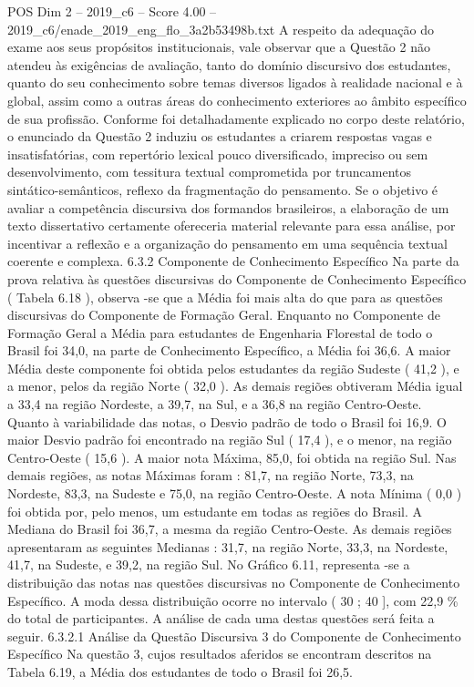 \begin{textsample}{POS Dim 2 – 2019\_c6 – Score 4.00 – 2019\_c6/enade\_2019\_eng\_flo\_3a2b53498b.txt}
A respeito da adequação do exame aos seus propósitos institucionais, vale observar que a Questão 2 não atendeu às exigências de avaliação, tanto do domínio discursivo dos estudantes, quanto do seu conhecimento sobre temas diversos ligados à realidade nacional e à global, assim como a outras áreas do conhecimento exteriores ao âmbito específico de sua profissão.
Conforme foi detalhadamente explicado no corpo deste relatório, o enunciado da Questão 2 induziu os estudantes a criarem respostas vagas e insatisfatórias, com repertório lexical pouco diversificado, impreciso ou sem desenvolvimento, com tessitura textual comprometida por truncamentos sintático-semânticos, reflexo da fragmentação do pensamento.
Se o objetivo é avaliar a competência discursiva dos formandos brasileiros, a elaboração de um texto dissertativo certamente ofereceria material relevante para essa análise, por incentivar a reflexão e a organização do pensamento em uma sequência textual coerente e complexa. 6.3.2 Componente de Conhecimento Específico Na parte da prova relativa às questões discursivas do Componente de Conhecimento Específico ( Tabela 6.18 ), observa -se que a Média foi mais alta do que para as questões discursivas do Componente de Formação Geral.
Enquanto no Componente de Formação Geral a Média para estudantes de Engenharia Florestal de todo o Brasil foi 34,0, na parte de Conhecimento Específico, a Média foi 36,6.
A maior Média deste componente foi obtida pelos estudantes da região Sudeste ( 41,2 ), e a menor, pelos da região Norte ( 32,0 ).
As demais regiões obtiveram Média igual a 33,4 na região Nordeste, a 39,7, na Sul, e a 36,8 na região Centro-Oeste.
Quanto à variabilidade das notas, o Desvio padrão de todo o Brasil foi 16,9.
O maior Desvio padrão foi encontrado na região Sul ( 17,4 ), e o menor, na região Centro-Oeste ( 15,6 ).
A maior nota Máxima, 85,0, foi obtida na região Sul.
Nas demais regiões, as notas Máximas foram : 81,7, na região Norte, 73,3, na Nordeste, 83,3, na Sudeste e 75,0, na região Centro-Oeste.
A nota Mínima ( 0,0 ) foi obtida por, pelo menos, um estudante em todas as regiões do Brasil.
A Mediana do Brasil foi 36,7, a mesma da região Centro-Oeste.
As demais regiões apresentaram as seguintes Medianas : 31,7, na região Norte, 33,3, na Nordeste, 41,7, na Sudeste, e 39,2, na região Sul.
No Gráfico 6.11, representa -se a distribuição das notas nas questões discursivas no Componente de Conhecimento Específico.
A moda dessa distribuição ocorre no intervalo ( 30 ; 40 ], com 22,9 \% do total de participantes.
A análise de cada uma destas questões será feita a seguir. 6.3.2.1 Análise da Questão Discursiva 3 do Componente de Conhecimento Específico Na questão 3, cujos resultados aferidos se encontram descritos na Tabela 6.19, a Média dos estudantes de todo o Brasil foi 26,5.

\end{textsample}
